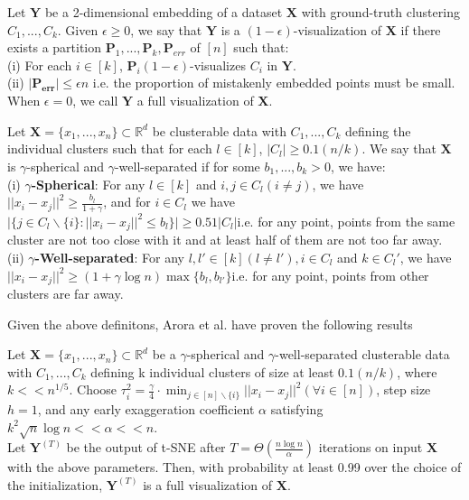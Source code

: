 \begin{definition}[Visualization]
    Let $\mathbf{Y}$ be a 2-dimensional embedding of a dataset
    $\mathbf{X}$ with ground-truth clustering $C_1,...,C_k$. Given
    $\epsilon \geq 0$, we say that $\mathbf{Y}$ is a
    $(1-\epsilon)$-visualization of $\mathbf{X}$ if there exists a
    partition $\mathbf{P}_1,...,\mathbf{P}_k,\mathbf{P}_{err}$ of
    $[n]$ such that:\\ 
    \indent (i) For each $i \in [k]$, $\mathbf{P}_i
    (1-\epsilon)$-visualizes $C_i$ in $\mathbf{Y}$.\\ 
    \indent (ii) $\vert \mathbf{P_{err}} \vert \leq \epsilon n$
    i.e. the proportion of mistakenly embedded points must be
    small.\\ 
    When $\epsilon = 0$, we call $\mathbf{Y}$ a full visualization of
    $\mathbf{X}$. 
\end{definition}

\begin{definition}
Let $\mathbf{X}=\{ x_1,...,x_n \} \subset \mathbb{R}^d$ be clusterable
data with $C_1,...,C_k$ defining the individual clusters such that for
each $l \in [k]$, $\vert C_l \vert \geq 0.1(n/k)$. We say that
$\mathbf{X}$ is $\gamma$-spherical and $\gamma$-well-separated if for
some $b_1,...,b_k > 0$, we have:\\ 
\indent (i) $\gamma$\textbf{-Spherical}: For any $l \in [k]$ and $i,j
\in C_l (i\neq j)$, we have $\vert \vert x_i -x_j \vert \vert^2 \geq
\frac{b_l}{1+\gamma}$, and for $i \in C_l$ we have $\vert \{ j \in C_l
\backslash \{ i\} : \vert \vert x_i - x_j \vert \vert^2 \leq b_l \}
\vert \geq 0.51 \vert C_l \vert $i.e. for any point, points from the
same cluster are not too close with it and at least half of them are
not too far away.\\ 
\indent (ii) $\gamma$\textbf{-Well-separated}: For any $l, l' \in
        [k](l\neq l'),i\in C_l$ and $k\in C_l'$, we have $\vert \vert
        x_i - x_j \vert \vert^2 \geq (1+\gamma \log n)\max \{ b_l,
        b_{l'}\}$i.e. for any point, points from other clusters are
        far away.\\ 
\end{definition}

\noindent Given the above definitons, Arora et al. have proven the
following results 
\begin{theorem}
    Let $\mathbf{X}=\{ x_1,...,x_n\} \subset \mathbb{R}^d$ be a
    $\gamma$-spherical and $\gamma$-well-separated clusterable data
    with $C_1,...,C_k$ defining k individual clusters of size at least
    $0.1(n/k)$, where $k<< n^{1/5}$. Choose $\tau^2_i =
    \frac{\gamma}{4} \cdot \min_{j\in [n]\backslash \{ i\}} \vert
    \vert x_i - x_j \vert \vert^2 (\forall i \in [n])$, step size
    $h=1$, and any early exaggeration coefficient $\alpha$ satisfying
    $k^2 \sqrt{n}\log n << \alpha << n$.\\ 
Let $\mathbf{Y}^{(T)}$ be the output of t-SNE after $T=\Theta
(\frac{n\log n}{\alpha})$ iterations on input $\mathbf{X}$ with the
above parameters. Then, with probability at least 0.99 over the choice
of the initialization, $\mathbf{Y}^{(T)}$ is a full visualization of
$\mathbf{X}$. 
\end{theorem}

